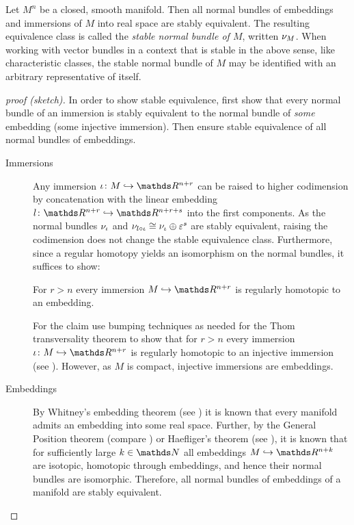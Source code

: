 \begin{LemDef}
  Let $M^n$ be a closed, smooth manifold.
  Then all normal bundles of embeddings and immersions of $M$ into
  real space are stably equivalent.
  The resulting equivalence class is called the
  \emph{stable normal bundle of $M$}, written $\nu_{M}$.
  When working with vector bundles in a context that is stable in the
  above sense, like \forexample characteristic classes, the stable
  normal bundle of $M$ may be identified with an arbitrary
  representative of itself.
  \begin{proof}[proof (sketch)]
    In order to show stable equivalence, first show that every
    normal bundle of an immersion is stably equivalent to the
    normal bundle of \emph{some} embedding (\idest some injective
    immersion). Then ensure stable equivalence of all normal bundles
    of embeddings.
    \begin{description}
    \item[Immersions]
      Any immersion $\imm\colon M\immto\R^{n+r}$ can be raised to
      higher codimension by concatenation with the linear embedding
      $l\colon\R^{n+r}\immto\R^{n+r+s}$ into the first components.
      As the normal bundles $\nu_{{\iota}}$ and
      $\nu_{l\circ{\iota}}\cong\nu_{{\iota}}\oplus\varepsilon^s$ are stably
      equivalent, raising the codimension does not change the stable
      equivalence class.
      Furthermore, since a regular homotopy yields an
      isomorphism on the normal bundles, it suffices to show:
      \begin{claim}
        For $r>n$ every immersion $M\immto\R^{n+r}$ is regularly
        homotopic to an embedding.
      \end{claim}
      For the claim use bumping techniques as needed for the
      Thom transversality theorem to show that for $r>n$ every
      immersion $\imm\colon M\immto\R^{n+r}$ is regularly homotopic to
      an injective immersion
      (see \forexample \cite[Chap.~II, Lemma~2.5]{adachi}).
      However, as $M$ is compact, injective immersions
      are embeddings.
    \item[Embeddings]
      By Whitney's embedding theorem
      (see \forexample \cite[Chap.~II.2]{adachi})
      it is known that every manifold admits an embedding into some
      real space.
      Further, by \forexample the General Position theorem
      (compare \cite[Chap.~2]{embeddingsummary})
      or Haefliger's theorem (see \forexample \cite[Chap.~II.1]{adachi}),
      it is known that for sufficiently large $k\in\Nat$ all embeddings
      $M\immto\R^{n+k}$ are isotopic, \idest homotopic through embeddings,
      and hence their normal bundles are isomorphic.
      Therefore, all normal bundles of embeddings of a manifold are
      stably equivalent.
    \end{description}
  \end{proof}
\end{LemDef}


